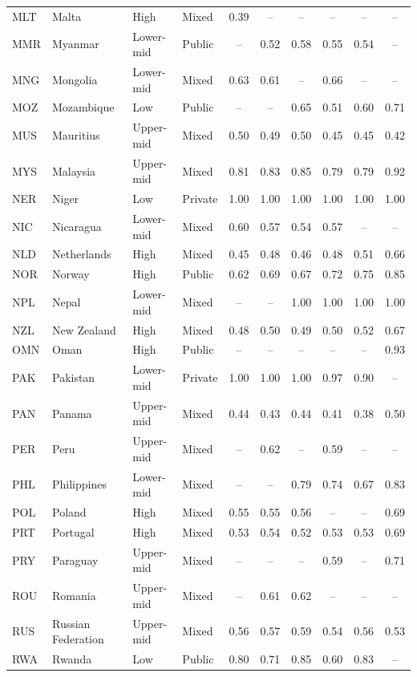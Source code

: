 \documentclass[11pt,letterpaper]{article}
\begin{document}
\begin{longtable}{@{}llllcccccc@{}}
MLT & Malta & High & Mixed & 0.39 & -- & -- & -- & -- & -- \\
MMR & Myanmar & Lower-mid & Public & -- & 0.52 & 0.58 & 0.55 & 0.54 & -- \\
MNG & Mongolia & Lower-mid & Mixed & 0.63 & 0.61 & -- & 0.66 & -- & -- \\
MOZ & Mozambique & Low & Public & -- & -- & 0.65 & 0.51 & 0.60 & 0.71 \\
MUS & Mauritius & Upper-mid & Mixed & 0.50 & 0.49 & 0.50 & 0.45 & 0.45 & 0.42 \\
MYS & Malaysia & Upper-mid & Mixed & 0.81 & 0.83 & 0.85 & 0.79 & 0.79 & 0.92 \\
NER & Niger & Low & Private & 1.00 & 1.00 & 1.00 & 1.00 & 1.00 & 1.00 \\
NIC & Nicaragua & Lower-mid & Mixed & 0.60 & 0.57 & 0.54 & 0.57 & -- & -- \\
NLD & Netherlands & High & Mixed & 0.45 & 0.48 & 0.46 & 0.48 & 0.51 & 0.66 \\
NOR & Norway & High & Public & 0.62 & 0.69 & 0.67 & 0.72 & 0.75 & 0.85 \\
NPL & Nepal & Lower-mid & Mixed & -- & -- & 1.00 & 1.00 & 1.00 & 1.00 \\
NZL & New Zealand & High & Mixed & 0.48 & 0.50 & 0.49 & 0.50 & 0.52 & 0.67 \\
OMN & Oman & High & Public & -- & -- & -- & -- & -- & 0.93 \\
PAK & Pakistan & Lower-mid & Private & 1.00 & 1.00 & 1.00 & 0.97 & 0.90 & -- \\
PAN & Panama & Upper-mid & Mixed & 0.44 & 0.43 & 0.44 & 0.41 & 0.38 & 0.50 \\
PER & Peru & Upper-mid & Mixed & -- & 0.62 & -- & 0.59 & -- & -- \\
PHL & Philippines & Lower-mid & Mixed & -- & -- & 0.79 & 0.74 & 0.67 & 0.83 \\
POL & Poland & High & Mixed & 0.55 & 0.55 & 0.56 & -- & -- & 0.69 \\
PRT & Portugal & High & Mixed & 0.53 & 0.54 & 0.52 & 0.53 & 0.53 & 0.69 \\
PRY & Paraguay & Upper-mid & Mixed & -- & -- & -- & 0.59 & -- & 0.71 \\
ROU & Romania & Upper-mid & Mixed & -- & 0.61 & 0.62 & -- & -- & -- \\
RUS & Russian Federation & Upper-mid & Mixed & 0.56 & 0.57 & 0.59 & 0.54 & 0.56 & 0.53 \\
RWA & Rwanda & Low & Public & 0.80 & 0.71 & 0.85 & 0.60 & 0.83 & -- \\

\end{longtable}
\end{document}
